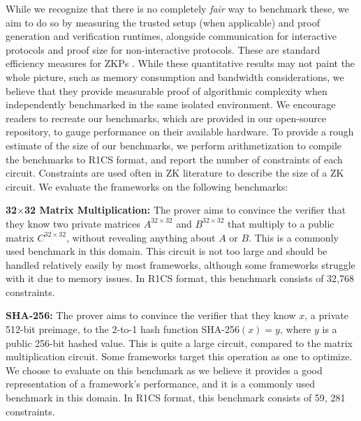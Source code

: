 While we recognize that there is no completely \textit{fair} way to benchmark these, we aim to do so by measuring the trusted setup (when applicable) and proof generation and verification runtimes, alongside communication for interactive protocols and proof size for non-interactive protocols. These are standard efficiency measures for ZKPs \cite{aurora}. While these quantitative results may not paint the whole picture, such as memory consumption and bandwidth considerations, we believe that they provide measurable proof of algorithmic complexity  when independently benchmarked in the same isolated environment. We encourage readers to recreate our benchmarks, which are provided in our open-source repository, to gauge performance on their available hardware. To provide a rough estimate of the size of our benchmarks, we perform arithmetization to compile the benchmarks to R1CS format, and report the number of constraints of each circuit. Constraints are used often in ZK literature to describe the size of a ZK circuit. We evaluate the frameworks on the following benchmarks:



\textbf{32$\times$32 Matrix Multiplication:} The prover aims to convince the verifier that they know two private matrices $\bm{\mathit{A^{32\times32}}}$ and $\bm{\mathit{B^{32\times32}}}$ that multiply to a public matrix $\bm{\mathit{C^{32\times32}}}$, without revealing anything about $\bm{\mathit{A}}$ or $\bm{\mathit{B}}$. This is a commonly used benchmark in this domain. This circuit is not too large and should be handled relatively easily by most frameworks, although some frameworks struggle with it due to memory issues. In R1CS format, this benchmark consists of 32,768 constraints.

\textbf{SHA-256:} 
The prover aims to convince the verifier that they know $x$, a private 512-bit preimage, to the 2-to-1 hash function SHA-256$(x)=y$, where $y$ is a public 256-bit hashed value. This is quite a large circuit, compared to the matrix multiplication circuit. Some frameworks target this operation as one to optimize. We choose to evaluate on this benchmark as we believe it provides a good representation of a framework's performance, and it is a commonly used benchmark in this domain. In R1CS format, this benchmark consists of 59, 281 constraints.

